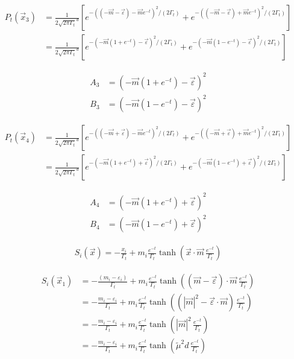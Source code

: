 \documentclass[11pt,a4paper]{article}
\begin{document}
\begin{align}
P_t(\vec{x}_3) &= \frac{1}{2\sqrt{2\pi\Gamma_t}^d}\left[
e^{-((-\vec{m}-\vec{\varepsilon})-\vec{m} e^{-t})^2/(2 \Gamma_t)}
+e^{-((-\vec{m}-\vec{\varepsilon})+\vec{m} e^{-t})^2/(2 \Gamma_t)}
\right] \\
&= \frac{1}{2\sqrt{2\pi\Gamma_t}^d}\left[
e^{-(-\vec{m}(1+e^{-t})-\vec{\varepsilon})^2/(2 \Gamma_t)}
+e^{-(-\vec{m}(1-e^{-t})-\vec{\varepsilon})^2/(2 \Gamma_t)}
\right]
\end{align}

\begin{align}
A_3 &= (-\vec{m}(1+e^{-t})-\vec{\varepsilon})^2 \\
B_3 &= (-\vec{m}(1-e^{-t})-\vec{\varepsilon})^2
\end{align}

\begin{align}
P_t(\vec{x}_4) &= \frac{1}{2\sqrt{2\pi\Gamma_t}^d}\left[
e^{-((-\vec{m}+\vec{\varepsilon})-\vec{m} e^{-t})^2/(2 \Gamma_t)}
+e^{-((-\vec{m}+\vec{\varepsilon})+\vec{m} e^{-t})^2/(2 \Gamma_t)}
\right] \\
&= \frac{1}{2\sqrt{2\pi\Gamma_t}^d}\left[
e^{-(-\vec{m}(1+e^{-t})+\vec{\varepsilon})^2/(2 \Gamma_t)}
+e^{-(-\vec{m}(1-e^{-t})+\vec{\varepsilon})^2/(2 \Gamma_t)}
\right]
\end{align}

\begin{align}
A_4 &= (-\vec{m}(1+e^{-t})+\vec{\varepsilon})^2 \\
B_4 &= (-\vec{m}(1-e^{-t})+\vec{\varepsilon})^2
\end{align}

\begin{align}
S_i(\vec{x}) = -\frac{x_i}{\Gamma_t}+m_i \frac{e^{-t}}{\Gamma_t}\tanh\left( \vec{x} \cdot \vec{m} \, \frac{e^{-t}}{\Gamma_t}\right)
\end{align}

\begin{align}
S_i(\vec{x}_1) &= -\frac{(m_i - \varepsilon_i)}{\Gamma_t}+m_i \frac{e^{-t}}{\Gamma_t}\tanh\left( (\vec{m} - \vec{\varepsilon}) \cdot \vec{m} \, \frac{e^{-t}}{\Gamma_t}\right) \\
&= -\frac{m_i - \varepsilon_i}{\Gamma_t}+m_i \frac{e^{-t}}{\Gamma_t}\tanh\left( (|\vec{m}|^2 - \vec{\varepsilon} \cdot \vec{m}) \, \frac{e^{-t}}{\Gamma_t}\right) \\
&= -\frac{m_i - \varepsilon_i}{\Gamma_t}+m_i \frac{e^{-t}}{\Gamma_t}\tanh\left( |\vec{m}|^2 \, \frac{e^{-t}}{\Gamma_t}\right) \\
&= -\frac{m_i - \varepsilon_i}{\Gamma_t}+m_i \frac{e^{-t}}{\Gamma_t}\tanh\left( \tilde{\mu}^2 d \, \frac{e^{-t}}{\Gamma_t}\right)
\end{align}
\end{document}
